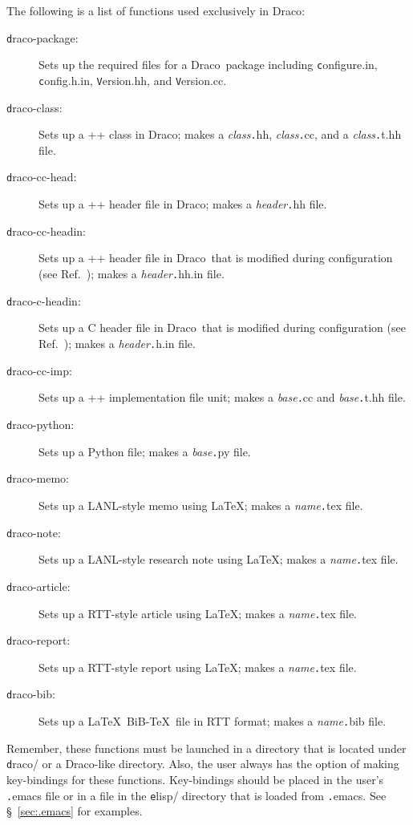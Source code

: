 \documentclass[11pt]{nmemo}
\newcommand{\comp}[1]{{\normalfont\texttt#1}}
\newcommand{\draco}{{\normalfont\sffamily Draco}}
\begin{document}
The following is a list of functions used exclusively in \draco:
\begin{description}
\item[\comp{draco-package}:] Sets up the required files for a \draco\ 
  package including \comp{configure.in}, \comp{config.h.in},
  \comp{Version.hh}, and \comp{Version.cc}.
\item[\comp{draco-class}:] Sets up a \C++ class in \draco; makes a
  \textsl{class}\comp{.hh}, \textsl{class}\comp{.cc}, and a
  \textsl{class}\comp{.t.hh} file.
\item[\comp{draco-cc-head}:] Sets up a \C++ header file in \draco;
  makes a \textsl{header}\comp{.hh} file.
\item[\comp{draco-cc-headin}:] Sets up a \C++ header file in \draco\ 
  that is modified during configuration (see Ref.~\cite{draco-build});
  makes a \textsl{header}\comp{.hh.in} file.
\item[\comp{draco-c-headin}:] Sets up a C header file in \draco\ that
  is modified during configuration (see Ref.~\cite{draco-build});
  makes a \textsl{header}\comp{.h.in} file.
\item[\comp{draco-cc-imp}:] Sets up a \C++ implementation file unit;
  makes a \textsl{base}\comp{.cc} and \textsl{base}\comp{.t.hh} file.
\item[\comp{draco-python}:] Sets up a Python file; makes a
  \textsl{base}\comp{.py} file.
\item[\comp{draco-memo}:] Sets up a LANL-style memo using \LaTeX;
  makes a \textsl{name}\comp{.tex} file.
\item[\comp{draco-note}:] Sets up a LANL-style research note using
  \LaTeX; makes a \textsl{name}\comp{.tex} file.
\item[\comp{draco-article}:] Sets up a RTT-style article using \LaTeX;
  makes a \textsl{name}\comp{.tex} file.
\item[\comp{draco-report}:] Sets up a RTT-style report using \LaTeX;
  makes a \textsl{name}\comp{.tex} file.
\item[\comp{draco-bib}:] Sets up a \LaTeX\ BiB-\TeX\ file in RTT
  format; makes a \textsl{name}\comp{.bib} file.
\end{description}

Remember, these functions must be launched in a directory that is
located under \comp{draco/} or a \draco-like directory.  Also, the
user always has the option of making key-bindings for these functions.
Key-bindings should be placed in the user's \comp{.emacs} file or in a
file in the \comp{elisp/} directory that is loaded from \comp{.emacs}.
See \S~\ref{sec:.emacs} for examples.
\end{document}
